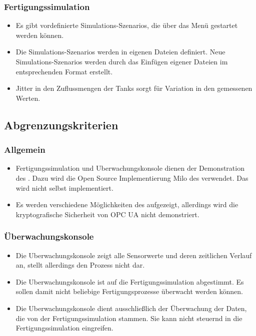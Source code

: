 \documentclass[parskip=full]{scrartcl}
\begin{document}
\subsubsection{Fertigungssimulation}
\begin{itemize}
  \item Es gibt vordefinierte \glspl{Simulations-Szenario}, die über das Menü gestartet werden können.
  \item Die \glspl{Simulations-Szenario} werden in eigenen Dateien definiert. Neue \glspl{Simulations-Szenario}
    werden durch das Einf\"ugen eigener Dateien im entsprechenden Format erstellt.
  \item \gls{Jitter} in den Zuflussmengen der Tanks sorgt f\"ur Variation in den gemessenen Werten.
\end{itemize}

\subsection{Abgrenzungskriterien}
\subsubsection{Allgemein}
\begin{itemize}
  \item \gls{Fertigungssimulation} und \gls{Uberwachungskonsole} dienen der Demonstration des . Dazu wird die Open Source
    Implementierung \gls{Milo} des  verwendet. Das  wird nicht selbst implementiert.
  \item Es werden verschiedene Möglichkeiten des  aufgezeigt, allerdings wird die kryptografische Sicherheit von \gls{OPC UA} nicht demonstriert.
\end{itemize}

\subsubsection{Überwachungskonsole}
\begin{itemize}
  \item Die \gls{Uberwachungskonsole} zeigt alle Sensorwerte und deren zeitlichen Verlauf an, stellt allerdings den Prozess nicht dar.
  \item Die \gls{Uberwachungskonsole} ist auf die \gls{Fertigungssimulation} abgestimmt. Es sollen damit nicht beliebige
    Fertigungsprozesse \"uberwacht werden k\"onnen.
  \item Die \gls{Uberwachungskonsole} dient ausschlie{\ss}lich der \"Uberwachung der Daten, die von der \gls{Fertigungssimulation}
    stammen. Sie kann nicht steuernd in die \gls{Fertigungssimulation} eingreifen.
\end{itemize}
\end{document}
